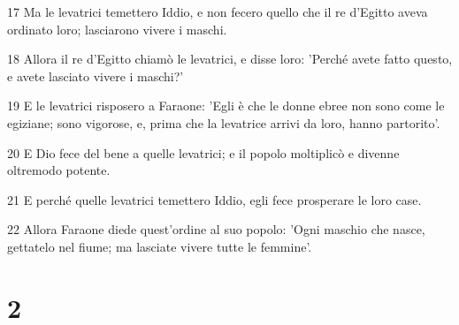 \par 17 Ma le levatrici temettero Iddio, e non fecero quello che il re d'Egitto aveva ordinato loro; lasciarono vivere i maschi.
\par 18 Allora il re d'Egitto chiamò le levatrici, e disse loro: 'Perché avete fatto questo, e avete lasciato vivere i maschi?'
\par 19 E le levatrici risposero a Faraone: 'Egli è che le donne ebree non sono come le egiziane; sono vigorose, e, prima che la levatrice arrivi da loro, hanno partorito'.
\par 20 E Dio fece del bene a quelle levatrici; e il popolo moltiplicò e divenne oltremodo potente.
\par 21 E perché quelle levatrici temettero Iddio, egli fece prosperare le loro case.
\par 22 Allora Faraone diede quest'ordine al suo popolo: 'Ogni maschio che nasce, gettatelo nel fiume; ma lasciate vivere tutte le femmine'.

\chapter{2}

